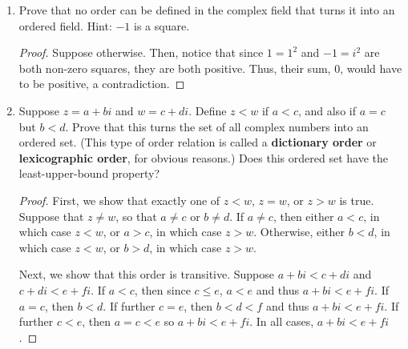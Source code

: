 \begin{enumerate}
\begin{enumerate}[(a)]
\begin{proof}
Similarly, if $b^x > y$, then from (e), there exists some $n \in \N$ such that $b^{x - 1/n} > y$, and so for any $w \in A$, we have $b^w < y < b^{x - 1/n}$ and thus $w < x - 1/n$ from the lemma in Exercise 6(c), making $x - 1/n$ a smaller upper bound for $A$, a contradiction.
\end{proof}

\item Prove that this $x$ is unique.
\begin{proof}
Suppose that $x \ne y$ in $\R$ and $b^x = b^y$. Without loss of generality, suppose $x < y$. But then $b^x < b^y$ from the statement proved in Exercise 6(c), contradicting our assumption, so we are done.
\end{proof}
\end{enumerate}

\item Prove that no order can be defined in the complex field that turns it into an ordered field. Hint: $-1$ is a square.

\begin{proof}
Suppose otherwise. Then, notice that since $1 = 1^2$ and $-1 = i^2$ are both non-zero squares, they are both positive. Thus, their sum, 0, would have to be positive, a contradiction.
\end{proof}

\item Suppose $z = a + bi$ and $w = c + di$. Define $z < w$ if $a < c$,  and also if $a = c$ but $b < d$. Prove that this turns the set of all complex numbers into an ordered set. (This type of order relation is called a \textbf{dictionary order} or \textbf{lexicographic order}, for obvious reasons.) Does this ordered set have the least-upper-bound property?

\begin{proof}
First, we show that exactly one of $z < w$, $z = w$, or $z > w$ is true. Suppose that $z \ne w$, so that $a \ne c$ or $b \ne d$. If $a \ne c$, then either $a < c$, in which case $z < w$, or $a > c$, in which case $z > w$. Otherwise, either $b < d$, in which case $z < w$, or $b > d$, in which case $z > w$. 

Next, we show that this order is transitive. Suppose $a + bi < c + di$ and $c + di < e + fi$. If $a < c$, then since $c \le e$, $a < e$ and thus $a + bi < e + fi$. If $a = c$, then $b < d$. If further $c = e$, then $b < d < f$ and thus $a + bi < e + fi$. If further $c < e$, then $a = c < e$ so $a + bi < e + fi$. In all cases, $a + bi < e + fi$.


\end{proof}
\end{enumerate}
